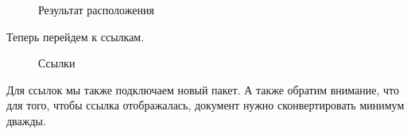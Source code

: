 \documentclass[
  english,
  russian,
  12pt,
  a4paper,
  DIV=11,
  numbers=noendperiod]{scrreprt}
\begin{document}
\begin{figure}


\caption{\label{fig-012}Результат расположения}

\end{figure}%

Теперь перейдем к ссылкам.

\begin{figure}


\caption{\label{fig-013}Ссылки}

\end{figure}%

Для ссылок мы также подключаем новый пакет. А также обратим внимание,
что для того, чтобы ссылка отображалась, документ нужно сконвертировать
минимум дважды.
\end{document}
